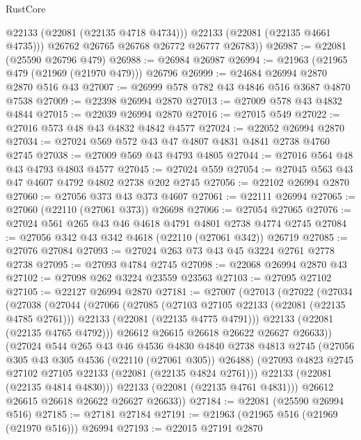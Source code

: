 \begin{lexlean}{RustCore}
\begin{coremodule}
            @22133
            (@22081 (@22135 @4718 @4734)))
          @22133
          (@22081 (@22135 @4661 @4735)))
        @26762
        @26765
        @26768
        @26772
        @26777
        @26783))
@26987 := @22081 (@25590 @26796 @479)
@26988 := @26984 @26987
@26994 := @21963 (@21965 @479 (@21969 (@21970 @479))) @26796
@26999 := @24684 @26994 @2870 @2870 @516 @43
@27007 := @26999 @578 @782 @43 @4846 @516 @3687 @4870 @7538
@27009 := @22398 @26994 @2870
@27013 := @27009 @578 @43 @4832 @4844
@27015 := @22039 @26994 @2870
@27016 := @27015 @549
@27022 := @27016 @573 @48 @43 @4832 @4842 @4577
@27024 := @22052 @26994 @2870
@27034 := @27024 @569 @572 @43 @47 @4807 @4831 @4841 @2738 @4760 @2745
@27038 := @27009 @569 @43 @4793 @4805
@27044 := @27016 @564 @48 @43 @4793 @4803 @4577
@27045 := @27024 @559
@27054 := @27045 @563 @43 @47 @4607 @4792 @4802 @2738 @202 @2745
@27056 := @22102 @26994 @2870
@27060 := @27056 @373 @43 @373 @4607
@27061 := @22111 @26994
@27065 := @27060 (@22110 (@27061 @373)) @26698
@27066 := @27054 @27065
@27076 := @27024 @561 @265 @43 @46 @4618 @4791 @4801 @2738 @4774 @2745
@27084 := @27056 @342 @43 @342 @4618 (@22110 (@27061 @342)) @26719
@27085 := @27076 @27084
@27093 := @27024 @263 @73 @43 @45 @3224 @2761 @2778 @2738
@27095 := @27093 @4784 @2745
@27098 := @22068 @26994 @2870 @43
@27102 := @27098 @262 @3224 @23559 @23563
@27103 := @27095 @27102
@27105 := @22127 @26994 @2870
@27181 := @27007
    (@27013
      (@27022
        (@27034
          (@27038
            (@27044
              (@27066
                (@27085
                  (@27103 @27105 @22133 (@22081 (@22135 @4785 @2761)))
                  @22133
                  (@22081 (@22135 @4775 @4791)))
                @22133
                (@22081 (@22135 @4765 @4792)))
              @26612
              @26615
              @26618
              @26622
              @26627
              @26633))
          (@27024
            @544
            @265
            @43
            @46
            @4536
            @4830
            @4840
            @2738
            @4813
            @2745
            (@27056 @305 @43 @305 @4536 (@22110 (@27061 @305)) @26488)
            (@27093 @4823 @2745 @27102 @27105 @22133 (@22081 (@22135 @4824 @2761)))
            @22133
            (@22081 (@22135 @4814 @4830)))
          @22133
          (@22081 (@22135 @4761 @4831)))
        @26612
        @26615
        @26618
        @26622
        @26627
        @26633))
@27184 := @22081 (@25590 @26994 @516)
@27185 := @27181 @27184
@27191 := @21963 (@21965 @516 (@21969 (@21970 @516))) @26994
@27193 := @22015 @27191 @2870

\end{coremodule}
\end{lexlean}
